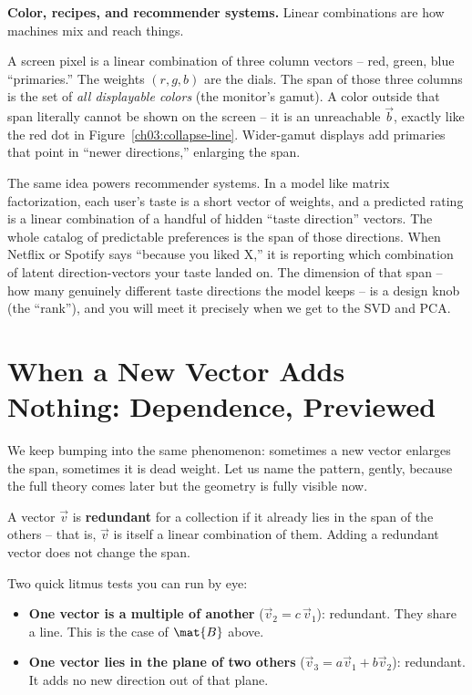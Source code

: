 \begin{applicationbox}
\textbf{Color, recipes, and recommender systems.} Linear combinations are how machines mix and reach things.

A screen pixel is a linear combination of three column vectors -- red, green, blue ``primaries.'' The weights $(r,g,b)$ are the dials. The span of those three columns is the set of \emph{all displayable colors} (the monitor's gamut). A color outside that span literally cannot be shown on the screen -- it is an unreachable $\vec{b}$, exactly like the red dot in Figure~\ref{ch03:collapse-line}. Wider-gamut displays add primaries that point in ``newer directions,'' enlarging the span.

The same idea powers recommender systems. In a model like matrix factorization, each user's taste is a short vector of weights, and a predicted rating is a linear combination of a handful of hidden ``taste direction'' vectors. The whole catalog of predictable preferences is the span of those directions. When Netflix or Spotify says ``because you liked X,'' it is reporting which combination of latent direction-vectors your taste landed on. The dimension of that span -- how many genuinely different taste directions the model keeps -- is a design knob (the ``rank''), and you will meet it precisely when we get to the SVD and PCA.
\end{applicationbox}

\section{When a New Vector Adds Nothing: Dependence, Previewed}

We keep bumping into the same phenomenon: sometimes a new vector enlarges the span, sometimes it is dead weight. Let us name the pattern, gently, because the full theory comes later but the geometry is fully visible now.

\begin{definition}\label{ch03:def-redundant}
A vector $\vec{v}$ is \textbf{redundant} for a collection if it already lies in the span of the others -- that is, $\vec{v}$ is itself a linear combination of them. Adding a redundant vector does not change the span.
\end{definition}

Two quick litmus tests you can run by eye:

\begin{itemize}
  \item \textbf{One vector is a multiple of another} ($\vec{v}_2 = c\,\vec{v}_1$): redundant. They share a line. This is the case of $\mat{B}$ above.
  \item \textbf{One vector lies in the plane of two others} ($\vec{v}_3 = a\vec{v}_1 + b\vec{v}_2$): redundant. It adds no new direction out of that plane.
\end{itemize}

